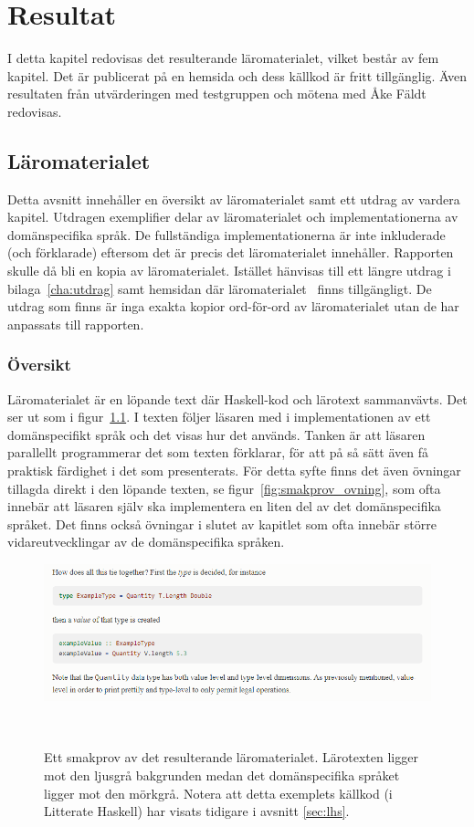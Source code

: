 \chapter{Resultat}

I detta kapitel redovisas det resulterande läromaterialet, vilket består av fem kapitel. Det är publicerat på en hemsida och dess källkod är fritt tillgänglig. Även
resultaten från utvärderingen med testgruppen och mötena med Åke Fäldt redovisas.

\section{Läromaterialet}\label{sec:res_laromaterial}

Detta avsnitt innehåller en översikt av läromaterialet samt ett utdrag av vardera kapitel. Utdragen exemplifier delar av läromaterialet och implementationerna av domänspecifika språk. De fullständiga implementationerna är inte inkluderade (och förklarade) eftersom det är precis det läromaterialet innehåller. Rapporten skulle då bli en kopia av läromaterialet. Istället hänvisas till ett längre utdrag i bilaga~\ref{cha:utdrag} samt hemsidan där läromaterialet~\cite{LYAP} finns tillgängligt. De utdrag som finns är inga exakta kopior ord-för-ord av läromaterialet utan de har anpassats till rapporten.

\subsection{Översikt}

Läromaterialet är en löpande text där Haskell-kod och lärotext sammanvävts. Det ser ut som i figur~\ref{fig:smakprov_laromaterial}. I texten följer läsaren med i implementationen av ett domänspecifikt språk och det visas hur det används. Tanken är att läsaren parallellt programmerar det som texten förklarar, för att på så sätt även få praktisk färdighet i det som presenterats. För detta syfte finns det även övningar tillagda direkt i den löpande texten, se figur~\ref{fig:smakprov_ovning}, som ofta innebär att läsaren själv ska implementera en liten del av det domänspecifika språket. Det finns också övningar i slutet av kapitlet som ofta innebär större vidareutvecklingar av de domänspecifika språken.

\begin{figure}[tph]
  \centering
  \includegraphics[width=\linewidth]{figure/smakprov_laromaterial.png}
  \caption{Ett smakprov av det resulterande läromaterialet. Lärotexten ligger mot den ljusgrå bakgrunden medan det domänspecifika språket ligger mot den mörkgrå. Notera att detta exemplets källkod (i Litterate Haskell) har visats tidigare i avsnitt \ref{sec:lhs}.}~\label{fig:smakprov_laromaterial}
\end{figure}

